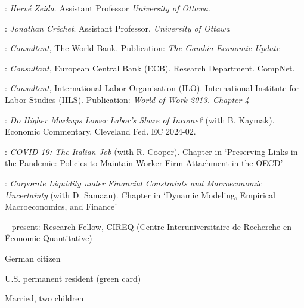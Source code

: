 \documentclass[11pt]{article}
\begin{document}
: \emph{Hervé Zeida}. Assistant Professor  \emph{University of Ottawa}.

:  \emph{Jonathan Créchet}. Assistant Professor. \emph{University of Ottawa}


: \emph{Consultant}, The World Bank. Publication: \emph{\href{http://documents1.worldbank.org/curated/en/170581614977174091/pdf/The-Gambia-Economic-Update-Preserving-the-Gains.pdf}{The Gambia Economic Update}}


: \emph{Consultant}, European Central Bank (ECB). Research Department. CompNet.

: \emph{Consultant}, International Labor Organisation (ILO). International
Institute for Labor Studies (IILS). Publication: \emph{\href{http://www.ilo.org/global/research/global-reports/world-of-work/2013/WCMS_214476/lang--en/index.htm}{World of Work 2013. Chapter 4}}




: \emph{Do Higher Markups Lower Labor’s Share of Income?} (with B. Kaymak). Economic Commentary. Cleveland Fed. EC 2024-02.  \vspace{+0.04in}

: \emph{COVID-19: The Italian Job} (with R. Cooper). Chapter in `Preserving Links in the Pandemic: Policies to Maintain Worker-Firm Attachment in the OECD'  \vspace{+0.04in}

: \emph{Corporate Liquidity under Financial Constraints and Macroeconomic Uncertainty} (with D. Samaan). Chapter in `Dynamic Modeling, Empirical Macroeconomics, and Finance'

 -- present: Research Fellow, CIREQ (Centre Interuniversitaire de Recherche en Économie Quantitative)


\ind German citizen

\ind U.S. permanent resident (green card)

\ind Married, two children
\end{document}
